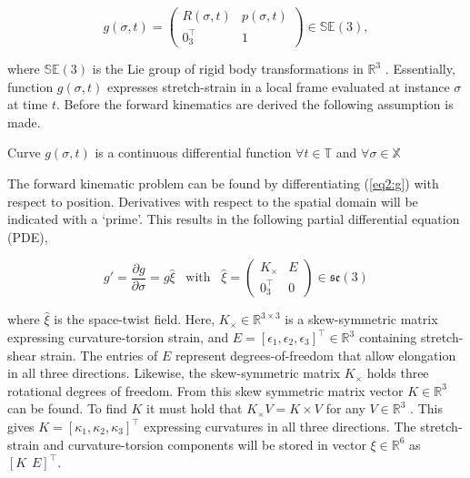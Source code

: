 \begin{equation}
    g(\sigma,t) = \begin{pmatrix}  R(\sigma,t) & p(\sigma,t) \\ 0_3^\top & 1 \end{pmatrix} \in \mathbb{SE}(3),
    \label{eq2:g}
\end{equation}

where $\mathbb{SE}(3)$ is the Lie group of rigid body transformations in $\mathbb{R}^3$ \cite{Sola2018}. Essentially, function $g(\sigma,t)$ expresses stretch-strain in a local frame evaluated at instance $\sigma$ at time $t$. Before the forward kinematics are derived the following assumption is made.

\begin{theorem}
Curve  $g(\sigma,t)$ is a continuous differential function $ \forall t \in 
\mathbb{T} $ and $\forall \sigma \in \mathbb{X}$
\end{theorem}

The forward kinematic problem can be found by differentiating (\ref{eq2:g}) with respect to position.
Derivatives with respect to the spatial domain will be indicated with a `prime'. This results in the following partial differential equation (PDE), 




\begin{equation}
   g' = \frac{\partial g}{\partial \sigma} = g \hat{\xi} \hspace{10pt} \text{with} \hspace{10pt}  \hat{\xi} = \begin{pmatrix} K_\times & E \\ 0_3^\top & 0 \end{pmatrix} \in  \mathfrak{se}(3)
    \label{eq2:dgdsigma}
\end{equation}

where $\hat{\xi}$ is the space-twist field. Here, $K_\times \in \mathbb{R}^{3\times 3}$ is a skew-symmetric matrix expressing curvature-torsion strain, and $E = [\epsilon_1,\epsilon_2,\epsilon_3]^\top \in \mathbb{R}^3$ containing stretch-shear strain. The entries of $E$ represent degrees-of-freedom that allow elongation in all three directions. Likewise, the skew-symmetric matrix $K_{\times}$ holds three rotational degrees of freedom. From this skew symmetric matrix vector $K \in \mathbb{R}^3$ can be found. To find $K$ it must hold that $K_\times V = K \times V$ for any $V \in \mathbb{R}^3$ \cite{Boyer2019}. This gives $K = [\kappa_1,\kappa_2,\kappa_3]^\top$ expressing curvatures in all three directions. The stretch-strain and curvature-torsion components will be stored in vector $\xi \in \mathbb{R}^6$ as $[K \hspace{5pt} E]^\top$.

